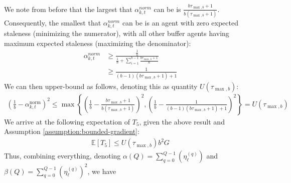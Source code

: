 \documentclass{article}
\begin{document}
We note from before that the largest that $\alpha_{k, t}^{norm}$ can be is $\frac{b\tau_{\max, b} + 1}{b(\tau_{\max, b} + 1)}$. Consequently, the smallest that $\alpha_{k, t}^{norm}$ can be is an agent with zero expected staleness (minimizing the numerator), with all other buffer agents having maximum expected staleness (maximizing the denominator):
\begin{align*}
   \alpha_{k, t}^{norm} 
   &\geq 
   \frac{\frac{1}{n}}{\frac{1}{n} + \sum_{i=1}^{b-1}{\frac{b\tau_{\max, b} + 1}{n}}}
    \\
    &\geq \frac{1}{(b-1)(b\tau_{\max, b} + 1) + 1}
\end{align*}
We can then upper-bound as follows, denoting this as quantity $U(\tau_{\max, b})$:
\begin{gather}
    \left(\frac{1}{b} - \alpha_{k, t}^{\text{norm}}\right)^2 
    \leq \max\left\{
        \left(
            \frac{1}{b} - \frac{b\tau_{\max, b} + 1}{b(\tau_{\max, b} + 1)}
        \right)^2,
        \left(
            \frac{1}{b} - \frac{1}{(b-1)(b\tau_{\max, b} + 1) + 1}
        \right)^2
    \right\} = U(\tau_{\max, b})
    \label{definition:umax}
\end{gather}
We arrive at the following expectation of $T_5$, given the above result and Assumption \ref{assumption:bounded-gradient}:
\begin{gather*}
    \mathbb{E}[T_5]
    \leq U(\tau_{\max, b}) b^2  G
\end{gather*}
Thus, combining everything, denoting $\alpha(Q) = \sum_{q=0}^{Q-1}(\eta_{\ell}^{(q)})$ and $\beta(Q) = \sum_{q=0}^{Q-1}(\eta_{\ell}^{(q)})^2$, we have
\end{document}
